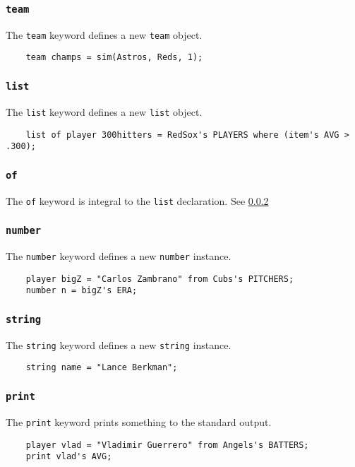 \subsubsection{\texttt{team}}
The \texttt{team} keyword defines a new \texttt{team} object.
\begin{verbatim}
    team champs = sim(Astros, Reds, 1);
\end{verbatim}

\subsubsection{\texttt{list}} \label{list}
The \texttt{list} keyword defines a new \texttt{list} object.
\begin{verbatim}
    list of player 300hitters = RedSox's PLAYERS where (item's AVG > .300);
\end{verbatim}

\subsubsection{\texttt{of}}\label{of}
The \texttt{of} keyword is integral to the \texttt{list} declaration. See \ref{list}


\subsubsection{\texttt{number}}
The \texttt{number} keyword defines a new \texttt{number} instance.
\begin{verbatim}
    player bigZ = "Carlos Zambrano" from Cubs's PITCHERS;
    number n = bigZ's ERA;
\end{verbatim}

\subsubsection{\texttt{string}}
The \texttt{string} keyword defines a new \texttt{string} instance. 
\begin{verbatim}
    string name = "Lance Berkman";
\end{verbatim}

\subsubsection{\texttt{print}}
The \texttt{print} keyword prints something to the standard output.
\begin{verbatim}
    player vlad = "Vladimir Guerrero" from Angels's BATTERS;
    print vlad's AVG;
\end{verbatim}

